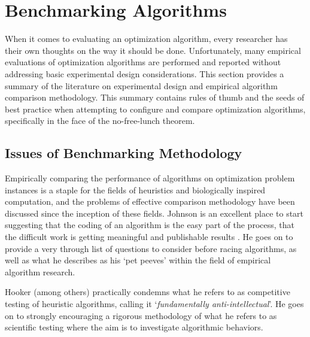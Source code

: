 
\section{Benchmarking Algorithms} 
\label{advanced:sec:racing_algorithms}

When it comes to evaluating an optimization algorithm, every researcher has their own thoughts on the way it should be done. Unfortunately, many empirical evaluations of optimization algorithms are performed and reported without addressing basic experimental design considerations. This section provides a summary of the literature on experimental design and empirical algorithm comparison methodology. This summary contains rules of thumb and the seeds of best practice when attempting to configure and compare optimization algorithms, specifically in the face of the no-free-lunch theorem.

% 
% 
\subsection{Issues of Benchmarking Methodology}
Empirically	comparing	the	performance	of algorithms on optimization problem instances is a staple for the fields of heuristics and biologically inspired computation, and the problems of effective comparison methodology have been discussed since the inception of these fields. Johnson is an excellent place to start suggesting that the coding of an algorithm is the easy part of the process, that the difficult work is getting meaningful and publishable results \cite{Johnson2002a}. He goes on to provide a very through list of questions to consider before racing algorithms, as well as what he describes as his `pet peeves' within the field of empirical algorithm research.

Hooker \cite{Hooker1995} (among others) practically condemns what he refers to as competitive testing of heuristic algorithms, calling it `\emph{fundamentally anti-intellectual}'. He goes on to strongly encouraging a rigorous methodology of what he refers to as scientific testing where the aim is to investigate algorithmic behaviors. 

